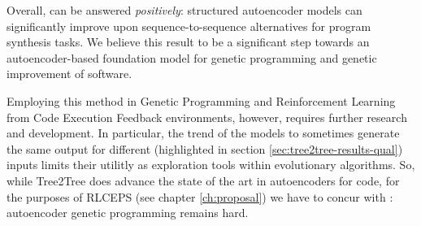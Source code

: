 Overall, \rqtree{} can be answered \emph{positively}: structured autoencoder models can significantly improve upon sequence-to-sequence alternatives for program synthesis tasks.
We believe this result to be a significant step towards an autoencoder-based foundation model for genetic programming and genetic improvement of software.

Employing this method in Genetic Programming and Reinforcement Learning from Code Execution Feedback environments, however, requires further research and development.
In particular, the trend of the models to sometimes generate the same output for different (highlighted in section \ref{sec:tree2tree-results-qual}) inputs limits their utilitly as exploration tools within evolutionary algorithms.
So, while Tree2Tree does advance the state of the art in autoencoders for code, for the purposes of RLCEPS (see chapter \ref{ch:proposal}) we have to concur with \cite{autoenc-gp}: autoencoder genetic programming remains hard.